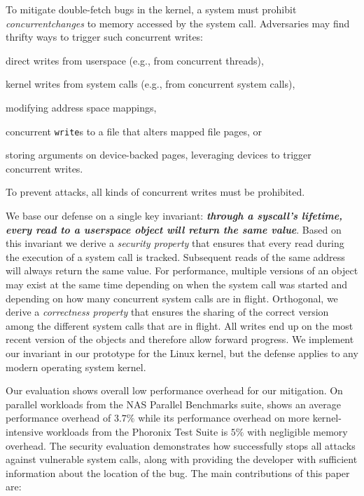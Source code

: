 \documentclass[letterpaper,twocolumn,10pt]{article}
\begin{document}
To mitigate double-fetch bugs in the kernel, a system must prohibit
\emph{concurrent\footnotemark changes} to memory accessed by the system call. Adversaries may
find thrifty ways to trigger such concurrent writes:
\begin{inparaenum}
\item  direct writes from userspace (e.g., from concurrent threads),
\item  kernel writes from system calls (e.g., from concurrent system calls),
\item  modifying address space mappings,
\item  concurrent \texttt{write}s to a file that alters mapped
file pages, or
\item  storing arguments on device-backed pages, leveraging devices to trigger
concurrent writes.
\end{inparaenum}
To prevent attacks, all kinds of concurrent writes must be prohibited.

We base our defense on a single key invariant: 
\textbf{\emph{through a syscall's lifetime, every read to a userspace object 
will return the same value}}. Based on this invariant we derive a \emph{security
property} that ensures that every read during the execution of a system call is
tracked. Subsequent reads of the same address will always return the same value.
For performance, multiple versions of an object may exist at the same time
depending on when the system call was started and depending on how many
concurrent system calls are in flight. Orthogonal, we derive a \emph{correctness
property} that ensures the sharing of the correct version among the different
system calls that are in flight. All writes end up on the most recent version of
the objects and therefore allow forward progress.
We implement our invariant in our \tiktok prototype for the Linux kernel, but
the defense applies to any modern operating system kernel.

Our evaluation shows overall low performance overhead for our mitigation.
On parallel workloads from the NAS Parallel Benchmarks suite, \tiktok shows 
an average performance overhead of $3.7\%$ while its performance overhead on
more kernel-intensive workloads from the Phoronix Test Suite is $5\%$ with 
negligible memory overhead.
The security evaluation demonstrates how \tiktok successfully stops all attacks
against vulnerable system calls, along with providing the developer with
sufficient information about the location of the bug.
%
The main contributions of this paper are:
\end{document}
